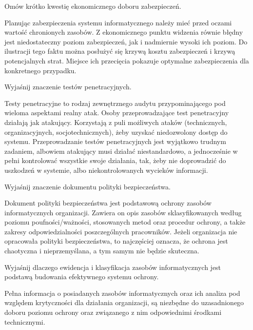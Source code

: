 \documentclass[answers,11pt]{exam}
\begin{document}
\begin{questions}

\question Omów krótko kwestię ekonomicznego doboru zabezpieczeń.
\begin{solution}
Planując zabezpieczenia systemu informatycznego należy mieć przed oczami wartość chronionych zasobów. Z ekonomicznego punktu widzenia równie błędny jest niedostateczny poziom zabezpieczeń, jak i nadmiernie wysoki ich poziom. Do ilustracji tego faktu można posłużyć się krzywą kosztu zabezpieczeń i krzywą potencjalnych strat. Miejsce ich przecięcia pokazuje optymalne zabezpieczenia dla konkretnego przypadku. 
\end{solution}

\question Wyjaśnij znaczenie testów penetracyjnych.
\begin{solution}
Testy penetracyjne to rodzaj zewnętrznego audytu przypominającego pod wieloma aspektami realny atak. Osoby przeprowadzające test penetracyjny działają jak atakujący. Korzystają z puli możliwych ataków (technicznych, organizacyjnych, socjotechnicznych), żeby uzyskać niedozwolony dostęp do systemu. Przeprowadzanie testów penetracyjnych jest wyjątkowo trudnym zadaniem, albowiem atakujący musi działać niestandardowo, a jednocześnie w pełni kontrolować wszystkie swoje działania, tak, żeby nie doprowadzić do uszkodzeń w systemie, albo niekontrolowanych wycieków informacji.
\end{solution}

\question Wyjaśnij znaczenie dokumentu polityki bezpieczeństwa.
\begin{solution}
Dokument polityki bezpieczeństwa jest podstawową ochrony zasobów informatycznych organizacji. Zawiera on opis zasobów sklasyfikowanych według poziomu poufności/ważności, stosowanych metod oraz procedur ochrony, a także zakresy odpowiedzialności poszczególnych pracowników. 
Jeżeli organizacja nie opracowała polityki bezpieczeństwa, to najczęściej oznacza, że ochrona jest chaotyczna i nieprzemyślana, a tym samym nie będzie skuteczna.
\end{solution}


\question Wyjaśnij dlaczego ewidencja i klasyfikacja zasobów informatycznych jest podstawą budowania efektywnego systemu ochrony.
\begin{solution}
Pełna informacja o posiadanych zasobów informatycznych oraz ich analiza pod względem krytyczności dla działania organizacji, są niezbędne do uzasadnionego doboru poziomu ochrony oraz związanego z nim odpowiednimi środkami technicznymi. 


\end{solution}
\end{questions}
\end{document}
